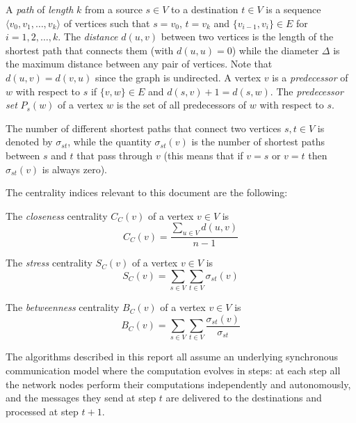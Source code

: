 A \emph{path} of \emph{length} $k$ from a source $s \in V$ to a destination $t \in V$ is a sequence $\langle v_0, v_1, \dots, v_k \rangle$ of vertices such that $s=v_0$, $t=v_k$ and $\{v_{i-1}, v_i\} \in E$ for $i = 1,2,\dots,k$. The \emph{distance} $d(u,v)$ between two vertices is the length of the shortest path that connects them (with $d(u,u) = 0$) while the diameter $\Delta$ is the maximum distance between any pair of vertices. Note that $d(u,v) = d(v,u)$ since the graph is undirected. A vertex $v$ is a \emph{predecessor} of $w$ with respect to $s$ if $\{v,w\} \in E$ and $d(s,v) +1 = d(s,w)$. The \emph{predecessor set} $P_s(w)$ of a vertex $w$ is the set of all predecessors of $w$ with respect to $s$.

The number of different shortest paths that connect two vertices $s,t \in V$ is denoted by $\sigma_{st}$, while the quantity $\sigma_{st}(v)$ is the number of shortest paths between $s$ and $t$ that pass through $v$ (this means that if $v = s$ or $v = t$ then $\sigma_{st}(v)$ is always zero).

The centrality indices relevant to this document are the following:
\begin{defcc} The \emph{closeness} centrality $C_C(v)$ of a vertex $v \in V$ is
\begin{equation}
 C_C(v) = \frac{\sum_{u \in V} d(u,v)}{n-1}
\end{equation}
\end{defcc}
\begin{defsc} The \emph{stress} centrality $S_C(v)$ of a vertex $v \in V$ is
\begin{equation}
 S_C(v) = \sum_{s \in V} \sum_{t \in V} \sigma_{st}(v)
\end{equation}
\end{defsc}
\begin{defbc} The \emph{betweenness} centrality $B_C(v)$ of a vertex $v \in V$ is
\begin{equation}
 B_C(v) = \sum_{s \in V} \sum_{t \in V} \frac{\sigma_{st}(v)}{\sigma_{st}}
\end{equation}
\end{defbc}

The algorithms described in this report all assume an underlying syn\-chro\-nous communication model where the computation evolves in steps: at each step all the network nodes perform their computations independently and autonomously, and the messages they send at step $t$ are delivered to the destinations and processed at step $t+1$.